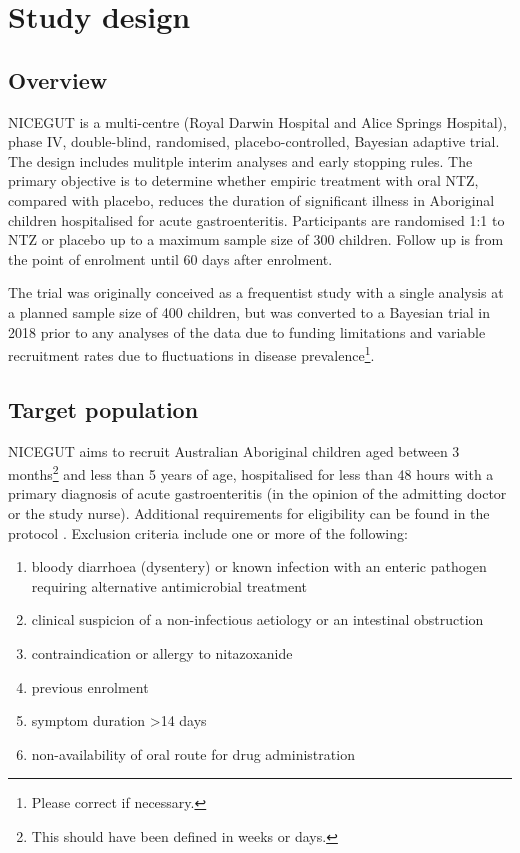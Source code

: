 \documentclass[a4paper]{article}
\begin{document}
\section{Study design}

\subsection{Overview}

NICEGUT is a multi-centre (Royal Darwin Hospital and Alice Springs Hospital), phase IV, double-blind, randomised, placebo-controlled, Bayesian adaptive trial.
The design includes mulitple interim analyses and early stopping rules.
The primary objective is to determine whether empiric treatment with oral NTZ, compared with placebo, reduces the duration of significant illness in Aboriginal children hospitalised for acute gastroenteritis.
Participants are randomised 1:1 to NTZ or placebo up to a maximum sample size of 300 children.
Follow up is from the point of enrolment until 60 days after enrolment.

The trial was originally conceived as a frequentist study with a single analysis at a planned sample size of 400 children, but was converted to a Bayesian trial in 2018 prior to any analyses of the data due to funding limitations and variable recruitment rates due to fluctuations in disease prevalence\footnote{Please correct if necessary.}.

\subsection{Target population}

NICEGUT aims to recruit Australian Aboriginal children aged between 3 months\footnote{This should have been defined in weeks or days.} and less than 5 years of age, hospitalised for less than 48 hours with a primary diagnosis of acute gastroenteritis (in the opinion of the admitting doctor or the study nurse).
Additional requirements for eligibility can be found in the protocol \cite{Waddingtone019632}.
Exclusion criteria include one or more of the following:
\begin{enumerate}
    \item bloody diarrhoea (dysentery) or known infection with an enteric pathogen requiring alternative antimicrobial treatment
    \item clinical suspicion of a non-infectious aetiology or an intestinal obstruction
    \item contraindication or allergy to nitazoxanide
    \item previous enrolment
    \item symptom duration >14 days
    \item non-availability of oral route for drug administration
\end{enumerate}
\end{document}
